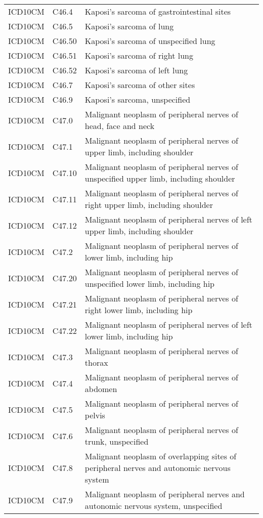 \begin{longtable}{p{}p{}p{}}
  ICD10CM & C46.4 & Kaposi's sarcoma of gastrointestinal sites \\ 
  ICD10CM & C46.5 & Kaposi's sarcoma of lung \\ 
  ICD10CM & C46.50 & Kaposi's sarcoma of unspecified lung \\ 
  ICD10CM & C46.51 & Kaposi's sarcoma of right lung \\ 
  ICD10CM & C46.52 & Kaposi's sarcoma of left lung \\ 
  ICD10CM & C46.7 & Kaposi's sarcoma of other sites \\ 
  ICD10CM & C46.9 & Kaposi's sarcoma, unspecified \\ 
  ICD10CM & C47.0 & Malignant neoplasm of peripheral nerves of head, face and neck \\ 
  ICD10CM & C47.1 & Malignant neoplasm of peripheral nerves of upper limb, including shoulder \\ 
  ICD10CM & C47.10 & Malignant neoplasm of peripheral nerves of unspecified upper limb, including shoulder \\ 
  ICD10CM & C47.11 & Malignant neoplasm of peripheral nerves of right upper limb, including shoulder \\ 
  ICD10CM & C47.12 & Malignant neoplasm of peripheral nerves of left upper limb, including shoulder \\ 
  ICD10CM & C47.2 & Malignant neoplasm of peripheral nerves of lower limb, including hip \\ 
  ICD10CM & C47.20 & Malignant neoplasm of peripheral nerves of unspecified lower limb, including hip \\ 
  ICD10CM & C47.21 & Malignant neoplasm of peripheral nerves of right lower limb, including hip \\ 
  ICD10CM & C47.22 & Malignant neoplasm of peripheral nerves of left lower limb, including hip \\ 
  ICD10CM & C47.3 & Malignant neoplasm of peripheral nerves of thorax \\ 
  ICD10CM & C47.4 & Malignant neoplasm of peripheral nerves of abdomen \\ 
  ICD10CM & C47.5 & Malignant neoplasm of peripheral nerves of pelvis \\ 
  ICD10CM & C47.6 & Malignant neoplasm of peripheral nerves of trunk, unspecified \\ 
  ICD10CM & C47.8 & Malignant neoplasm of overlapping sites of peripheral nerves and autonomic nervous system \\ 
  ICD10CM & C47.9 & Malignant neoplasm of peripheral nerves and autonomic nervous system, unspecified \\ 

\end{longtable}
